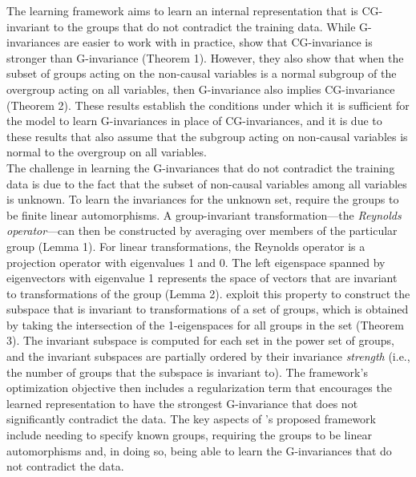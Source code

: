 The learning framework aims to learn an internal representation that is CG-invariant to the groups that do not contradict the training data. While G-invariances are easier to work with in practice, \citeauthor{Mouli:2021} show that CG-invariance is stronger than G-invariance (Theorem 1). However, they also show that when the subset of groups acting on the non-causal variables is a normal subgroup of the overgroup acting on all variables, then G-invariance also implies CG-invariance (Theorem 2). These results establish the conditions under which it is sufficient for the model to learn G-invariances in place of CG-invariances, and it is due to these results that \citeauthor{Mouli:2021} also assume that the subgroup acting on non-causal variables is normal to the overgroup on all variables.
\\

The challenge in learning the G-invariances that do not contradict the training data is due to the fact that the subset of non-causal variables among all variables is unknown. To learn the invariances for the unknown set, \citeauthor{Mouli:2021} require the groups to be finite linear automorphisms. A group-invariant transformation---the \textit{Reynolds operator}---can then be constructed by averaging over members of the particular group (Lemma 1). For linear transformations, the Reynolds operator is a projection operator with eigenvalues 1 and 0. The left eigenspace spanned by eigenvectors with eigenvalue 1 represents the space of vectors that are invariant to transformations of the group (Lemma 2). \citeauthor{Mouli:2021} exploit this property to construct the subspace that is invariant to transformations of a set of groups, which is obtained by taking the intersection of the 1-eigenspaces for all groups in the set (Theorem 3). The invariant subspace is computed for each set in the power set of groups, and the invariant subspaces are partially ordered by their invariance \textit{strength} (i.e., the number of groups that the subspace is invariant to). The framework's optimization objective then includes a regularization term that encourages the learned representation to have the strongest G-invariance that does not significantly contradict the data. The key aspects of \citeauthor{Mouli:2021}'s proposed framework include needing to specify known groups, requiring the groups to be linear automorphisms and, in doing so, being able to learn the G-invariances that do not contradict the data.
\\

